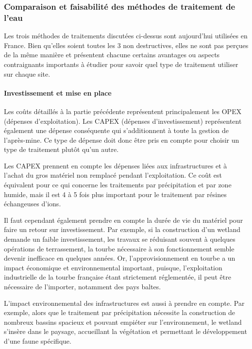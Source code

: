 \documentclass{article}
\begin{document}
\subsubsection{Comparaison et faisabilité des méthodes de traitement de l'eau}
Les trois méthodes de traitements discutées ci-dessus sont aujourd’hui utilisées en France. Bien qu’elles soient toutes les 3 non destructives, elles ne sont pas perçues de la même manière et présentent chacune certains avantages ou aspects contraignants importants à étudier pour savoir quel type de traitement utiliser sur chaque site.


\paragraph{Investissement et mise en place}

Les coûts détaillés à la partie précédente représentent principalement les OPEX (dépenses d’exploitation). Les CAPEX (dépenses d’investissement) représentent également une dépense conséquente qui s'additionnent à toute la gestion de l’après-mine. Ce type de dépense doit donc être pris en compte pour choisir un type de traitement plutôt qu’un autre.

Les CAPEX prennent en compte les dépenses liées aux infrastructures et à l’achat du gros matériel non remplacé pendant l’exploitation. Ce coût est équivalent pour ce qui concerne les traitements par précipitation et par zone humide, mais il est 4 à 5 fois plus important pour le traitement par résines échangeuses d’ions.

Il faut cependant également prendre en compte la durée de vie du matériel pour faire un retour sur investissement. Par exemple, si la construction d’un wetland demande un faible investissement, les travaux se réduisant souvent à quelques opérations de terrassement, la tourbe nécessaire à son fonctionnement semble devenir inefficace en quelques années. Or, l’approvisionnement en tourbe a un impact économique et environnemental important, puisque, l’exploitation industrielle de la tourbe française étant strictement réglementée, il peut être nécessaire de l’importer, notamment des pays baltes. 

L’impact environnemental des infrastructures est aussi à prendre en compte. Par exemple, alors que le traitement par précipitation nécessite la construction de nombreux bassins spacieux et pouvant empiéter sur l’environnement, le wetland s’insère dans le paysage, accueillant la végétation et permettant le développement d’une faune spécifique.
\end{document}
